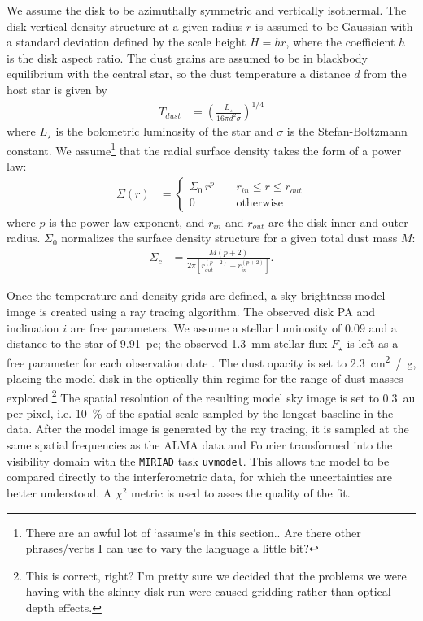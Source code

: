 \documentclass[12pt,oneside]{article}
\begin{document}
We assume the disk to be azimuthally symmetric and vertically isothermal. 
The disk vertical density structure at a given radius $r$ is assumed to be Gaussian with a standard deviation defined by the scale height $H=hr$, where the coefficient $h$ is the disk aspect ratio.
The dust grains are assumed to be in blackbody equilibrium with the central star, so the dust temperature a distance $d$ from the host star is given by
\begin{align}
  T_{dust} &= \left( \frac{L_{\star}}{16 \pi d^2 \sigma} \right)^{1/4}
\end{align}
where $L_{\star}$ is the bolometric luminosity of the star and $\sigma$ is the Stefan-Boltzmann constant. We assume\footnote{There are an awful lot of `assume's in this section.. Are there other phrases/verbs I can use to vary the language a little bit?} that the radial surface density takes the form of a power law: 
\begin{align}
\Sigma(r) &= \begin{cases}
\Sigma_0 \, r^{p} \; \; \; \; & r_{in} \leq r \leq r_{out} \\
0 \; \; \; \; &\mbox{otherwise} 
\end{cases}
\end{align}
where $p$ is the power law exponent, and $r_{in}$ and $r_{out}$ are the disk inner and outer radius. 
$\Sigma_0$ normalizes the surface density structure for a given total dust mass $M$:
\begin{align}
\Sigma_c &= \frac{M \left(p + 2 \right)}{2 \pi \left[ r_{out}^{(p+2)} - r_{in}^{(p+2)} \right]}.
\end{align}

Once the temperature and density grids are defined, a sky-brightness model image is created using a ray tracing algorithm. 
The observed disk PA and inclination $i$ are free parameters.
We assume a stellar luminosity of \SI{0.09}{\Lsun} and a distance to the star of \SI{9.91}{pc}; the observed \SI{1.3}{mm} stellar flux $F_\star$ is left as a free parameter for each observation date \citep{plavchan09,vanleeuwen07}.
The dust opacity is set to \SI{2.3}{\cm^2 / \gram}, placing the model disk in the optically thin regime for the range of dust masses explored.\footnote{This is correct, right? I'm pretty sure we decided that the problems we were having with the skinny disk run were caused gridding rather than optical depth effects.} 
The spatial resolution of the resulting model sky image is set to \SI{0.3}{au} per pixel, i.e. \SI{10}{\percent} of the spatial scale sampled by the longest baseline in the data. 
After the model image is generated by the ray tracing, it is sampled at the same spatial frequencies as the ALMA data and Fourier transformed into the visibility domain with the \texttt{MIRIAD} task \texttt{uvmodel}. 
This allows the model to be compared directly to the interferometric data, for which the uncertainties are better understood.
A $\chi^2$ metric is used to asses the quality of the fit.
\end{document}
